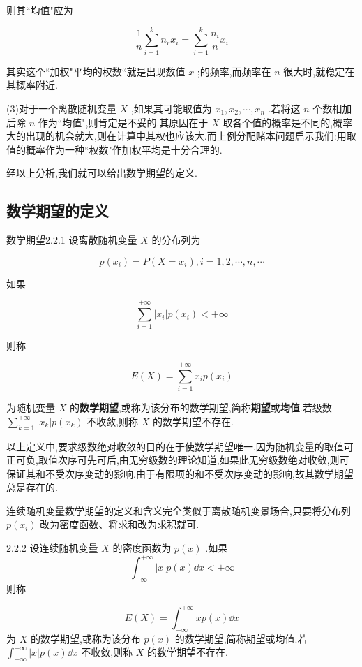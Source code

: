 则其``均值"应为

\[ 
\frac{1}{n} \sum_{i=1}^{k} n_{\dot{r}} x_{i}=\sum_{i=1}^{k} \frac{n_{i}}{n} x_{i}
\]

其实这个``加权"平均的权数``就是出现数值 $ x $ ;的频率,而频率在 $ n $ 很大时,就稳定在其概率附近.

(3)对于一个离散随机变量 $ X $ ,如果其可能取值为 $ x_{1}, x_{2}, \cdots, x_{n} $ .若将这 $ n $ 个数相加后除 $ n $ 作为``均值",则肯定是不妥的.其原因在于 $ X $ 取各个值的概率是不同的,概率大的出现的机会就大,则在计算中其权也应该大.而上例分配赌本问题启示我们:用取值的概率作为一种``权数"作加权平均是十分合理的.

经以上分析,我们就可以给出数学期望的定义.

\subsection{数学期望的定义}\label{ssec:2.2.2}

\begin{definition}{数学期望}{2.2.1}
	设离散随机变量 $ X $ 的分布列为
	
	\[ 
	p\left(x_{i}\right)=P\left(X=x_{i}\right), i=1,2, \cdots, n, \cdots
	\]
	
	如果
	
	\[ 
	\sum_{i=1}^{+\infty}\left|x_{i}\right| p\left(x_{i}\right)<+\infty
	\]
	
	则称
	
	\begin{equation} 
	E(X)=\sum_{i=1}^{+\infty} x_{i} p\left(x_{i}\right) \label{eq:2.2.1}
	\end{equation}
	
	为随机变量 $ X $ 的\textbf{数学期望},或称为该分布的数学期望,简称\textbf{期望}或\textbf{均值}.若级数 $ \sum_{k=1}^{+\infty}\left|x_{k}\right| p\left(x_{k}\right) $ 不收敛,则称 $ X $ 的数学期望不存在.
\end{definition}

以上定义中,要求级数绝对收敛的目的在于使数学期望唯一.因为随机变量的取值可正可负,取值次序可先可后,由无穷级数的理论知道,如果此无穷级数绝对收敛,则可保证其和不受次序变动的影响.由于有限项的和不受次序变动的影响,故其数学期望总是存在的.

连续随机变量数学期望的定义和含义完全类似于离散随机变景场合,只要将分布列 $ p(x_i) $ 改为密度函数、将求和改为求积就可.

\begin{definition}{}{2.2.2}
	设连续随机变量 $ X $ 的密度函数为 $ p(x) $ .如果
	\[ 
	\int_{-\infty}^{+\infty}|x| p(x) \dd x<+\infty
	\]
	则称
	
	\begin{equation} 
	E(X)=\int_{-\infty}^{+\infty} x p(x) \dd x \label{eq:2.2.2}
	\end{equation}
	为 $ X $ 的数学期望,或称为该分布 $ p(x) $ 的数学期望,简称期望或均值.若 $ \int_{-\infty}^{+\infty}|x| p(x) \dd x $ 不收敛,则称 $ X $ 的数学期望不存在.
	
\end{definition}

